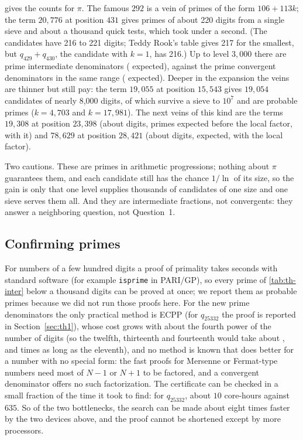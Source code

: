 gives the counts for $\pi$. The famous $292$ is a vein of \ThInterThree{} primes of the form $106 + 113k$; the term $20{,}776$ at position $431$ gives \ThInterFourThirty{} primes of about 220 digits from a single sieve and about a thousand quick tests, which took under a second. (The candidates have 216 to 221 digits; Teddy Rook's table gives 217 for the smallest, but $q_{429} + q_{430}$, the candidate with $k = 1$, has 216.) Up to level $3{,}000$ there are \ThInterTotal{} prime intermediate denominators (\ThInterExp{} expected), against the \ThInterConv{} prime convergent denominators in the same range (\ThInterConvExp{} expected). Deeper in the expansion the veins are thinner but still pay: the term $19{,}055$ at position $15{,}543$ gives $19{,}054$ candidates of nearly 8{,}000 digits, of which \ThInterBigSurv{} survive a sieve to $10^7$ and \ThInterBig{} are probable primes ($k = 4{,}703$ and $k = 17{,}981$). The next veins of this kind are the terms $19{,}308$ at position $23{,}398$ (about \TwVeinOneDig{} digits, \TwVeinOneExp{} primes expected before the local factor, \TwVeinOneExpL{} with it) and $78{,}629$ at position $28{,}421$ (about \TwVeinTwoDig{} digits, \TwVeinTwoExp{} expected, \TwVeinTwoExpL{} with the local factor).

Two cautions. These are primes in arithmetic progressions; nothing about $\pi$ guarantees them, and each candidate still has the chance $1/\ln$ of its size, so the gain is only that one level supplies thousands of candidates of one size and one sieve serves them all. And they are intermediate fractions, not convergents: they answer a neighboring question, not Question~1.

\subsection{Confirming primes}

For numbers of a few hundred digits a proof of primality takes seconds with standard software (for example \texttt{isprime} in PARI/GP), so every prime of \cref{tab:th-inter} below a thousand digits can be proved at once; we report them as probable primes because we did not run those proofs here. For the new prime denominators the only practical method is ECPP \citep{AtkinMorain1993,Enge2024} (for $q_{25332}$ the proof is reported in Section~\ref{sec:th1}), whose cost grows with about the fourth power of the number of digits (so the twelfth, thirteenth and fourteenth would take about \TwEcpp, \TtEcpp{} and \FoEcpp{} times as long as the eleventh), and no method is known that does better for a number with no special form: the fast proofs for Mersenne or Fermat-type numbers need most of $N - 1$ or $N + 1$ to be factored, and a convergent denominator offers no such factorization. The certificate can be checked in a small fraction of the time it took to find: for $q_{25332}$, about $10$ core-hours against $635$. \addedon{\revG} So of the two bottlenecks, the search can be made about eight times faster by the two devices above, and the proof cannot be shortened except by more processors.

